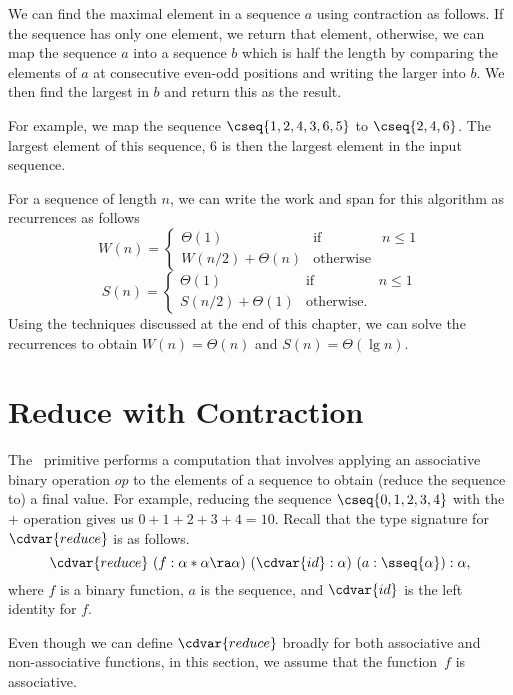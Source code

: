 \begin{example}
We can find the maximal element in a sequence $a$ using contraction as
follows.
%
If the sequence has only one element, we return that element,
%
otherwise,
%
we can map the sequence $a$ into a sequence $b$ which is half the
length by comparing the elements of $a$ at consecutive even-odd
positions and writing the larger into $b$.
%
We then find the largest in $b$ and return this as the result.

For example, we map the sequence
%
$\cseq{1,2,4,3,6,5}$ 
%
to 
%
$\cseq{2,4,6}$.
% 
The largest element of this sequence, $6$ is then the largest element
in the input sequence.
%

%
For a sequence of length $n$, we can write the work and span for this
algorithm as recurrences as follows
\[
W(n) = \left\{
\begin{array}{lll}
\Theta(1) & \mbox{if} & n \le 1
\\
W(n/2) + \Theta(n) &  \mbox{otherwise}
\end{array}
\right.
\]
%
\[
S(n) = \left\{
\begin{array}{lll}
\Theta(1) & \mbox{if} & n \le 1
\\
S(n/2) + \Theta(1) &  \mbox{otherwise}.
\end{array}
\right.
\]
%
Using the techniques discussed at the end of this chapter, we can solve
the recurrences to obtain $W(n) = \Theta(n)$ and $S(n) =
\Theta(\lg{n})$.
\end{example}

\section{Reduce with Contraction}
\label{sec:design::contraction::reduce}

\begin{gram}
The~ primitive performs a computation that involves
applying an associative binary operation $op$ to the elements of a
sequence to obtain (reduce the sequence to) a final value.
%
For example, reducing the sequence $\cseq{0,1,2,3,4}$ with the $+$
operation gives us $0 + 1 + 2 + 3 + 4 = 10$.
%
Recall that the type signature for~$\cdvar{reduce}$ is as follows.
%
\[
\cdvar{reduce}~(f: \alpha * \alpha \ra \alpha)~(\cdvar{id}: \alpha)~(a: \sseq{\alpha}): \alpha,
\]
where $f$ is a binary function, $a$ is the sequence, and $\cdvar{id}$
is the left identity for $f$.
%

Even though we can define $\cdvar{reduce}$ broadly for both associative
and non-associative functions, in this section, we assume that the
function~$f$ is associative.

\end{gram}

